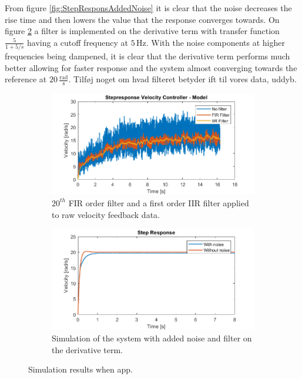 \documentclass[../../main.tex]{subfiles}
\begin{document}
From figure \ref{fig:StepResponsAddedNoise} it is clear that the noise decreases the rise time and then lowers the value that the response converges towards. On figure \ref{fig:StepResponsAddedNoiseAndFilter} a filter is implemented on the derivative term with transfer function $\frac{5}{1+5/s}$ having a cutoff frequency at $5\,\mathrm{Hz}$. With the noise components at higher frequencies being dampened, it is clear that the derivative term performs much better allowing for faster response and the system almost converging towards the reference at $20\,\frac{\mathrm{rad}}{\mathrm{s}}$. Tilføj noget om hvad filteret betyder ift til vores data, uddyb.\\

\begin{figure}[H]
     \centering
     \begin{subfigure}[b]{0.49\textwidth}
         \centering
    \includegraphics[width=\textwidth]{Sections/Miscellaneous/Images/FilteredStepRespons20Order.png}
    \caption{$20^{th}$ FIR order filter and a first order IIR filter applied to raw velocity feedback data.}
    \label{fig:FilteredStepRespons20Order}
     \end{subfigure}
     \hfill
     \begin{subfigure}[b]{0.49\textwidth}
         \centering
         \includegraphics[width=\textwidth]{Sections/Miscellaneous/Images/StepResponsNoiseAndFilter.png}
         \caption{Simulation of the system with added noise and filter on the derivative term.}
         \label{fig:StepResponsAddedNoiseAndFilter}
     \end{subfigure}
        \caption{Simulation results when app.}
        \label{fig:FilterDiskussionImplementedFilter20}
\end{figure}
\end{document}
